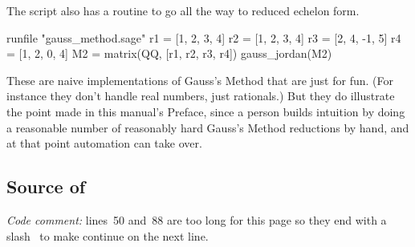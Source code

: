 The script also has a routine to go all the way to reduced echelon form.
\begin{sageoutput}[d,0,1]
runfile "gauss_method.sage"
r1 = [1, 2, 3, 4]
r2 = [1, 2, 3, 4]
r3 = [2, 4, -1, 5]
r4 = [1, 2, 0, 4]
M2 = matrix(QQ, [r1, r2, r3, r4])
gauss_jordan(M2)            
\end{sageoutput}

These are naive implementations of Gauss's Method that are just for fun.
(For instance they don't handle real numbers, just rationals.)
But they do illustrate the point made in this manual's Preface, 
since a person
builds intuition by doing a reasonable number of reasonably hard Gauss's Method
reductions by hand, and at that point automation can take over.


\subsection{Source of \protect{}}
\textit{Code comment:} lines~50 and~88 are too long
for this page so they end with a 
slash~\inlinecode{\\} to make \python{} continue on the
next line. 


\endinput


TODO:
